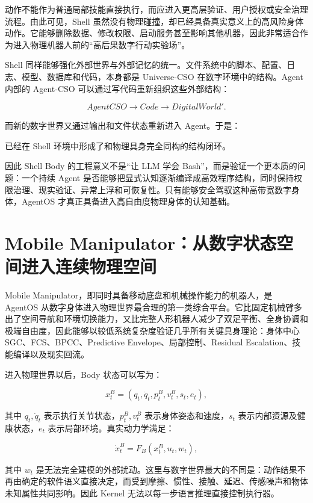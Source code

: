 动作不能作为普通局部技能直接执行，而应进入更高层验证、用户授权或安全治理流程。由此可见，Shell 虽然没有物理碰撞，却已经具备真实意义上的高风险身体动作。它能够删除数据、修改权限、启动服务甚至影响其他机器，因此非常适合作为进入物理机器人前的“高后果数字行动实验场”。

Shell 同样能够强化外部世界与外部记忆的统一。文件系统中的脚本、配置、日志、模型、数据库和代码，本身都是 Universe-CSO 在数字环境中的结构。Agent 内部的 Agent-CSO 可以通过写代码重新组织这些外部结构：

$$
AgentCSO
\rightarrow
Code
\rightarrow
DigitalWorld'.
$$

而新的数字世界又通过输出和文件状态重新进入 Agent。于是：

\begin{statementbox}
\centering
{}
\end{statementbox}

已经在 Shell 环境中形成了和物理具身完全同构的结构闭环。

因此 Shell Body 的工程意义不是“让 LLM 学会 Bash”，而是验证一个更本质的问题：一个持续 Agent 是否能够把显式认知逐渐编译成高效程序结构，同时保持权限治理、现实验证、异常上浮和可恢复性。只有能够安全驾驭这种高带宽数字身体，AgentOS 才真正具备进入高自由度物理身体的认知基础。

\section{Mobile Manipulator：从数字状态空间进入连续物理空间}

Mobile Manipulator，即同时具备移动底盘和机械操作能力的机器人，是 AgentOS 从数字身体进入物理世界最合理的第一类综合平台。它比固定机械臂多出了空间导航和环境切换能力，又比完整人形机器人减少了双足平衡、全身协调和极端自由度，因此能够以较低系统复杂度验证几乎所有关键具身理论：身体中心 SGC、FCS、BPCC、Predictive Envelope、局部控制、Residual Escalation、技能编译以及现实回流。

进入物理世界以后，Body 状态可以写为：

$$
x_t^B
=
(
q_t,\dot q_t,
p_t^B,
v_t^B,
s_t,
e_t
),
$$

其中 $q_t,\dot q_t$ 表示执行关节状态，$p_t^B,v_t^B$ 表示身体姿态和速度，$s_t$ 表示内部资源及健康状态，$e_t$ 表示局部环境。真实动力学满足：

$$
\dot x_t^B
=
F_B(x_t^B,u_t,w_t),
$$

其中 $w_t$ 是无法完全建模的外部扰动。这里与数字世界最大的不同是：动作结果不再由确定的软件语义直接决定，而受到摩擦、惯性、接触、延迟、传感噪声和物体未知属性共同影响。因此 Kernel 无法以每一步语言推理直接控制执行器。

